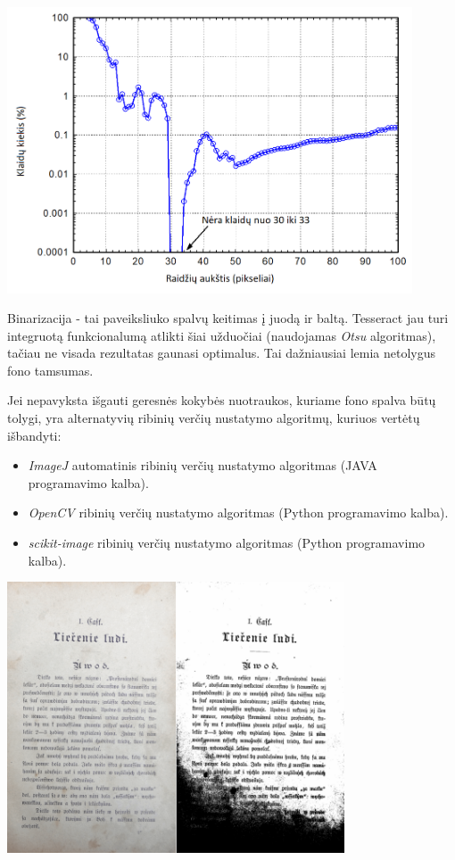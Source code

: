 \documentclass{VUMIFInfBakalaurinis}
\begin{document}
\begin{minipage}{\linewidth}
  \includegraphics[width=12cm]{tess4_error_rate.png}
  \label{tess4_error_rate}
\end{minipage}
Binarizacija - tai paveiksliuko spalvų keitimas į juodą ir baltą. Tesseract jau turi integruotą funkcionalumą atlikti šiai užduočiai (naudojamas \textit{Otsu} algoritmas),
tačiau ne visada rezultatas gaunasi optimalus. Tai dažniausiai lemia netolygus fono tamsumas.

Jei nepavyksta išgauti geresnės kokybės nuotraukos, kuriame fono spalva būtų tolygi, yra alternatyvių ribinių verčių nustatymo algoritmų, kuriuos vertėtų išbandyti:
\begin{itemize}
  \item \textit{ImageJ} automatinis ribinių verčių nustatymo algoritmas (JAVA programavimo kalba).
  \item \textit{OpenCV} ribinių verčių nustatymo algoritmas (Python programavimo kalba).
  \item \textit{scikit-image} ribinių verčių nustatymo algoritmas (Python programavimo kalba).
\end{itemize}

\begin{minipage}{\linewidth}
  \centering
  \includegraphics[width=10cm]{binarisation.png}
  \label{binarisation}
\end{minipage}
\end{document}
